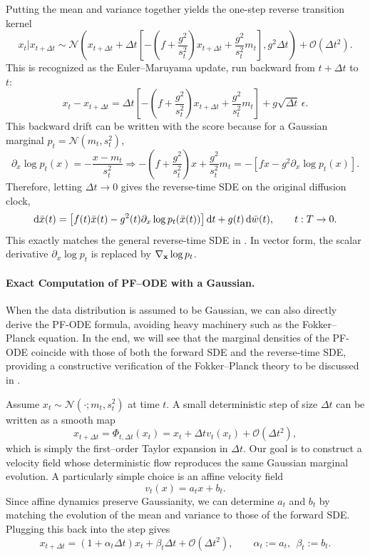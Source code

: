 Putting the mean and variance together yields the one-step reverse transition kernel
\[
x_t    |    x_{t+\Delta t}
 \sim 
\mathcal N\!\left(
x_{t+\Delta t} + \Delta t\!\left[-\left(f+\frac{g^2}{s_t^2}\right)  x_{t+\Delta t} + \frac{g^2}{s_t^2}  m_t\right],
 g^2  \Delta t\right)
 +  \mathcal{O}(\Delta t^2).
\]
This is recognized as the Euler--Maruyama update, run backward from
$t+\Delta t$ to $t$:
\[
x_t - x_{t+\Delta t}
= \Delta t\!\left[-\left(f+\frac{g^2}{s_t^2}\right) x_{t+\Delta t}
+ \frac{g^2}{s_t^2} m_t\right]
+ g\sqrt{\Delta t}\,\epsilon.
\]
This backward drift can be written with the score because for a Gaussian
marginal $p_t=\mathcal N(m_t,s_t^2)$,
\[
\partial_x \log p_t(x) = -\frac{x-m_t}{s_t^2}
 \Longrightarrow
-\left(f+\frac{g^2}{s_t^2}\right)x
+\frac{g^2}{s_t^2}m_t
=
-\left[f x-g^2\partial_x\log p_t(x)\right].
\]
Therefore, letting $\Delta t\to0$ gives the reverse-time SDE on the original
diffusion clock,
\[
\mathop{}\!\mathrm{d} \bar x(t)
=
\left[
f(t)\bar x(t)
-
g^2(t)\partial_x\log p_t(\bar x(t))
\right]\mathop{}\!\mathrm{d} t
+
g(t)\mathop{}\!\mathrm{d}\bar w(t),
\qquad t:T\to0.
\]
This exactly matches the general reverse-time SDE in
. In vector form, the scalar derivative
$\partial_x\log p_t$ is replaced by
$\nabla_{{\mathbf{x}}}\log p_t$.

\paragraph{Exact Computation of PF–ODE with a Gaussian.}
When the data distribution is assumed to be Gaussian, we can also directly derive the PF-ODE formula, avoiding heavy machinery such as the Fokker–Planck equation. In the end, we will see that the marginal densities of the PF-ODE coincide with those of both the forward SDE and the reverse-time SDE, providing a constructive verification of the Fokker–Planck theory to be discussed in .


Assume $x_t\sim\mathcal N(\cdot;m_t,s_t^2)$ at time $t$. A small deterministic step of size $\Delta t$ can be written as a smooth map
\[
x_{t+\Delta t}=\Phi_{t,\Delta t}(x_t)
= x_t + \Delta t v_t(x_t) + \mathcal{O}(\Delta t^2),
\]
which is simply the first–order Taylor expansion in $\Delta t$.
Our goal is to construct a velocity field whose deterministic flow reproduces
the same Gaussian marginal evolution. A particularly simple choice is an affine velocity field
\[
v_t(x)=a_t x+b_t.
\]
Since affine dynamics preserve Gaussianity, we can determine $a_t$ and $b_t$
by matching the evolution of the mean and variance to those of the forward
SDE. Plugging this back into the step gives
\[
x_{t+\Delta t}=(1+\alpha_t \Delta t) x_t+\beta_t \Delta t+\mathcal{O}(\Delta t^2),
\qquad
\alpha_t:=a_t,\ \ \beta_t:=b_t.
\]

